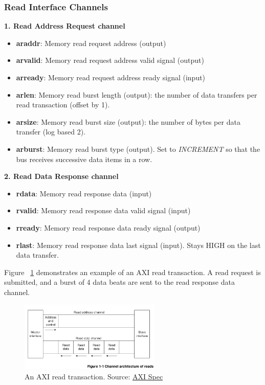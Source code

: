 \documentclass[11pt]{article}
\begin{document}
\subsubsection{Read Interface Channels}

\textbf{1. Read Address Request channel}
\begin{itemize}
\item \textbf{araddr}: Memory read request address (output)
\item \textbf{arvalid}: Memory read request address valid signal (output)
\item \textbf{arready}: Memory read request address ready signal (input)
\item \textbf{arlen}: Memory read burst length (output): the number of data transfers per read transaction (offset by 1).
\item \textbf{arsize}: Memory read burst size (output): the number of bytes per data transfer (log based 2).
\item \textbf{arburst}: Memory read burst type (output). Set to \textit{INCREMENT} so that the bus receives successive data items in a row.
\end{itemize}

\textbf{2. Read Data Response channel}
\begin{itemize}
\item \textbf{rdata}: Memory read response data (input)
\item \textbf{rvalid}: Memory read response data valid signal (input)
\item \textbf{rready}: Memory read response data ready signal (output)
\item \textbf{rlast}: Memory read response data last signal (input). Stays HIGH on the last data transfer.
\end{itemize}

Figure ~\ref{fig:axi_read} demonstrates an example of an AXI read transaction.
A read request is submitted, and a burst of 4 data beats are sent to the read response data channel.

\begin{figure}[hbt]
\begin{center}
  \includegraphics[width=0.6\textwidth]{axi_read.png}
  \caption{An AXI read transaction. Source: \href{https://developer.arm.com/documentation/ihi0022/b}{AXI Spec}}
  \label{fig:axi_read}
\end{center}
\end{figure}
\end{document}
